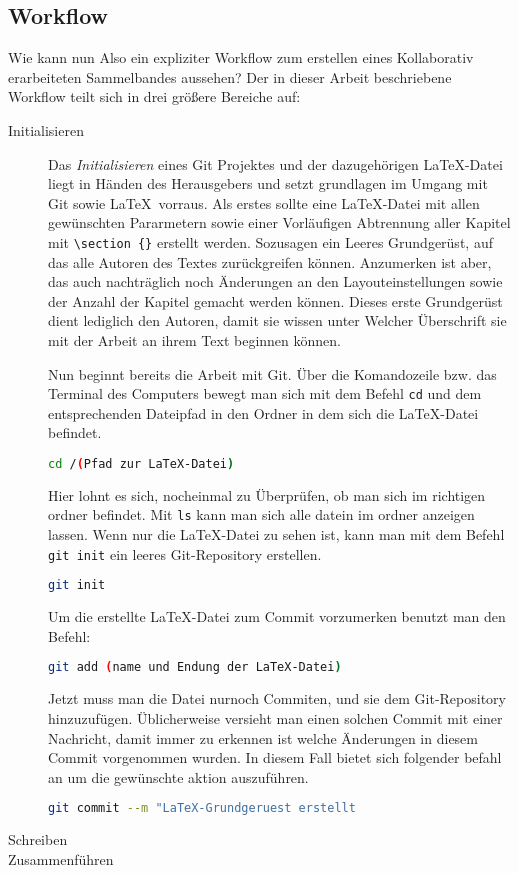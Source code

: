 \documentclass[12pt,a4paper]{scrartcl}
\begin{document}
\subsection{Workflow}
Wie kann nun Also ein expliziter Workflow zum erstellen eines Kollaborativ erarbeiteten Sammelbandes aussehen? Der in dieser Arbeit beschriebene Workflow teilt sich in drei größere Bereiche auf:

\begin{description}
\item[Initialisieren] Das \emph{Initialisieren} eines Git Projektes und der dazugehörigen \LaTeX -Datei liegt in Händen des Herausgebers und setzt grundlagen im Umgang mit Git sowie \LaTeX \ vorraus. Als erstes sollte eine \LaTeX -Datei mit allen gewünschten Pararmetern sowie einer Vorläufigen Abtrennung aller Kapitel mit \verb+\section+~\verb+{}+ erstellt werden. Sozusagen ein Leeres Grundgerüst, auf das alle Autoren des Textes zurückgreifen können. Anzumerken ist aber, das auch nachträglich noch Änderungen an den Layouteinstellungen sowie der Anzahl der Kapitel gemacht werden können. Dieses erste Grundgerüst dient lediglich den Autoren, damit sie wissen unter Welcher Überschrift sie mit der Arbeit an ihrem Text beginnen können.

Nun beginnt bereits die Arbeit mit Git. Über die Komandozeile bzw. das Terminal des Computers bewegt man sich mit dem Befehl \verb+cd+ und dem entsprechenden Dateipfad in den Ordner in dem sich die \LaTeX -Datei befindet.
\begin{lstlisting}[language=bash]
cd /(Pfad zur LaTeX-Datei)
\end{lstlisting}
 Hier lohnt es sich, nocheinmal zu Überprüfen, ob man sich im richtigen ordner befindet. Mit \verb+ls+ kann man sich alle datein im ordner anzeigen lassen. Wenn nur die \LaTeX-Datei zu sehen ist, kann man mit dem Befehl \verb+git init+ ein leeres Git-Repository erstellen.
\begin{lstlisting}[language=bash]
git init
\end{lstlisting}
 Um die erstellte \LaTeX -Datei zum Commit vorzumerken benutzt man den Befehl:
\begin{lstlisting}[language=bash]
git add (name und Endung der LaTeX-Datei)
\end{lstlisting} Jetzt muss man die Datei nurnoch Commiten, und sie dem Git-Repository hinzuzufügen. Üblicherweise versieht man einen solchen Commit mit einer Nachricht, damit immer zu erkennen ist welche Änderungen in diesem Commit vorgenommen wurden. In diesem Fall bietet sich folgender befahl an um die gewünschte aktion auszuführen.
\begin{lstlisting}[language=bash]
git commit --m "LaTeX-Grundgeruest erstellt
\end{lstlisting}
\item[Schreiben] 
\item[Zusammenführen] 
\end{description}
\end{document}
